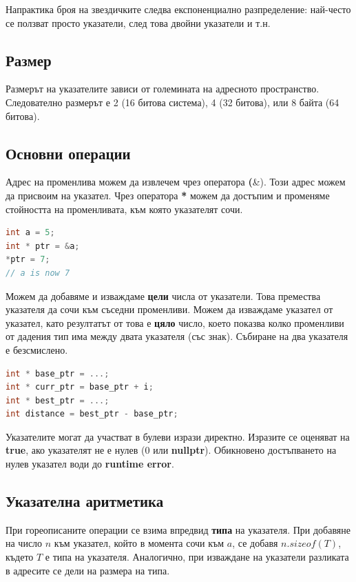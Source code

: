 \documentclass[fleqn,12pt]{article}
\begin{document}
Напрактика броя на звездичките следва експоненциално разпределение: най-често се ползват просто указатели, след това двойни указатели и т.н.

\subsection{Размер}
Размерът на указателите зависи от големината на адресното пространство. Следователно размерът е 2 (16 битова система), 4 (32 битова), 
или 8 байта (64 битова).

\subsection{Основни операции}
Адрес на променлива можем да извлечем чрез оператора \textbf(\&). Този адрес можем да присвоим на указател. 
Чрез оператора \textbf{*} можем да достъпим и променяме стойността на променливата, към която указателят сочи.
\begin{lstlisting}[language=C++, caption=Pointer example 2]
int a = 5;
int * ptr = &a;
*ptr = 7;
// a is now 7
\end{lstlisting}

Можем да добавяме и изваждаме \textbf{цели} числа от указатели. Това премества указателя да сочи към съседни променливи.
Можем да изваждаме указател от указател, като резултатът от това е \textbf{цяло} число, което показва колко променливи от 
дадения тип има между двата указателя (със знак). Събиране на два указателя е безсмислено.

\begin{lstlisting}[language=C++, caption=Pointer example 3]
int * base_ptr = ...;
int * curr_ptr = base_ptr + i;
int * best_ptr = ...;
int distance = best_ptr - base_ptr;
\end{lstlisting}

Указателите могат да участват в булеви изрази директно. Изразите се оценяват на \textbf{true}, ако указателят не е нулев (0 или \textbf{nullptr}).
Обикновено достъпването на нулев указател води до \textbf{runtime error}.

\subsection{Указателна аритметика}
При гореописаните операции се взима впредвид \textbf{типа} на указателя. При добавяне на число $n$ към указател, който в момента сочи към $a$, се 
добавя $n . sizeof(T)$, където $T$ е типа на указателя. Аналогично, при изваждане на указатели разликата в адресите се дели на размера на типа.
\end{document}
